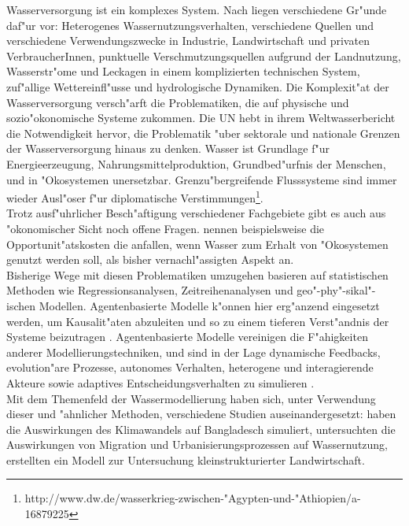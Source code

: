\documentclass[11pt,a4paper]{article}
\begin{document}
Wasserversorgung ist ein komplexes System. Nach \citet{Moglia2010} liegen verschiedene Gr"unde daf"ur vor: Heterogenes Wassernutzungsverhalten, verschiedene Quellen und verschiedene Verwendungszwecke in Industrie, Landwirtschaft und privaten VerbraucherInnen, punktuelle Verschmutzungsquellen aufgrund der Landnutzung, Wasserstr"ome und Leckagen in einem komplizierten technischen System, zuf"allige Wettereinfl"usse und hydrologische Dynamiken. Die Komplexit"at der Wasserversorgung versch"arft die Problematiken, die auf physische und sozio"okonomische Systeme zukommen. Die UN hebt in ihrem Weltwasserbericht \citep{UN2012} die Notwendigkeit hervor, die Problematik "uber sektorale und nationale Grenzen der Wasserversorgung hinaus zu denken. Wasser ist Grundlage f"ur Energieerzeugung, Nahrungsmittelproduktion, Grundbed"urfnis der Menschen, und in "Okosystemen unersetzbar. Grenzu"bergreifende Flusssysteme sind immer wieder Ausl"oser f"ur diplomatische Verstimmungen\footnote{http://www.dw.de/wasserkrieg-zwischen-"Agypten-und-"Athiopien/a-16879225}. \\
Trotz ausf"uhrlicher Besch"aftigung verschiedener Fachgebiete gibt es auch aus "okonomischer Sicht noch offene Fragen. \cite{Castellano2008} nennen beispielsweise die Opportunit"atskosten die anfallen, wenn Wasser zum Erhalt von "Okosystemen genutzt werden soll, als bisher vernachl"assigten Aspekt an. \\
Bisherige Wege mit diesen Problematiken umzugehen basieren auf statistischen Methoden wie Regressionsanalysen, Zeitreihenanalysen und geo"-phy"-sikal"-ischen Modellen. Agentenbasierte Modelle k"onnen hier erg"anzend eingesetzt werden, um Kausalit"aten abzuleiten und so zu einem tieferen Verst"andnis der Systeme beizutragen \citep{Galan2011}. Agentenbasierte Modelle vereinigen die F"ahigkeiten anderer Modellierungstechniken, und sind in der Lage dynamische Feedbacks, evolution"are Prozesse, autonomes Verhalten, heterogene und interagierende Akteure sowie adaptives Entscheidungsverhalten zu simulieren \citep{Heckbert2010}.\\
Mit dem Themenfeld der Wassermodellierung haben sich, unter Verwendung dieser und "ahnlicher Methoden, verschiedene Studien auseinandergesetzt: \cite{Angus2009} haben die Auswirkungen des Klimawandels auf Bangladesch simuliert, \cite{Galan2011} untersuchten die Auswirkungen von Migration und Urbanisierungsprozessen auf Wassernutzung, \cite{Wise2012} erstellten ein Modell zur Untersuchung kleinstrukturierter Landwirtschaft. \\
\end{document}
